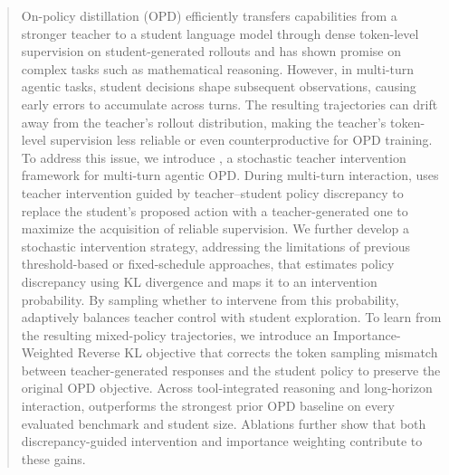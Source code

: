 \begin{abstract}
On-policy distillation (OPD) efficiently transfers capabilities from a stronger teacher to a student language model through dense token-level supervision on student-generated rollouts and has shown promise on complex tasks such as mathematical reasoning.
However, in multi-turn agentic tasks, student decisions shape subsequent observations, causing early errors to accumulate across turns.
The resulting trajectories can drift away from the teacher's rollout distribution, making the teacher's token-level supervision less reliable or even counterproductive for OPD training.
To address this issue, we introduce \name, a stochastic teacher intervention framework for multi-turn agentic OPD.
During multi-turn interaction, \name uses teacher intervention guided by teacher--student policy discrepancy to replace the student's proposed action with a teacher-generated one to maximize the acquisition of reliable supervision.
We further develop a stochastic intervention strategy, addressing the limitations of previous threshold-based or fixed-schedule approaches, that estimates policy discrepancy using KL divergence and maps it to an intervention probability. 
By sampling whether to intervene from this probability, \name adaptively balances teacher control with student exploration.
To learn from the resulting mixed-policy trajectories, we introduce an Importance-Weighted Reverse KL objective that corrects the token sampling mismatch between teacher-generated responses and the student policy to preserve the original OPD objective.
Across tool-integrated reasoning and long-horizon interaction, \name outperforms the strongest prior OPD baseline on every evaluated benchmark and student size.
Ablations further show that both discrepancy-guided intervention and importance weighting contribute to these gains.
\end{abstract}
